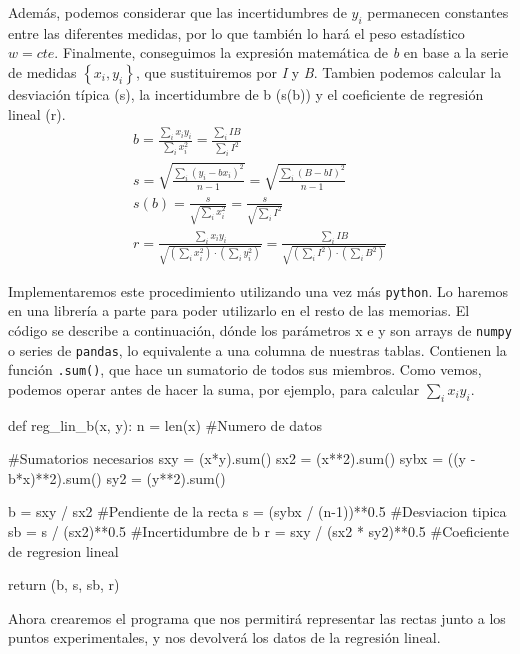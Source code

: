 \documentclass[12pt, a4paper, titlepage]{article}
\newcommand{\code}[1]{\texttt{#1}} %
\begin{document}
  Además, podemos considerar que las incertidumbres de $y_i$ permanecen constantes entre las diferentes medidas, por lo que también lo hará el peso estadístico $w = cte$. Finalmente, conseguimos la expresión matemática de \textit{b} en base a la serie de medidas $\left\{ x_i, y_i \right\}$, que sustituiremos por \textit{I} y \textit{B}. Tambien podemos calcular la desviación típica (s), la incertidumbre de b (s(b)) y el coeficiente de regresión lineal (r).
  \begin{gather}
    b = \frac{\sum_i{x_i y_i}}{\sum_i{x_i^2}} = \frac{\sum_i{I B}}{\sum_i{I^2}} \label{ec:regb} \\
    s = \sqrt{\frac{\sum_i{(y_i - bx_i)^2}}{n - 1}} = \sqrt{\frac{\sum_i{(B - bI)^2}}{n - 1}} \label{ec:regs} \\
    s(b) = \frac{s}{\sqrt{\sum_i{x_i^2}}} = \frac{s}{\sqrt{\sum_i{I^2}}} \label{ec:regsb} \\
    r = \frac{\sum_i{x_i y_i}}{\sqrt{(\sum_i{x_i^2}) \cdot (\sum_i{y_i^2})}} = \frac{\sum_i{I B}}{\sqrt{(\sum_i{I^2}) \cdot (\sum_i{B^2})}} \label{ec:regr}
  \end{gather}

  Implementaremos este procedimiento utilizando una vez más \code{python}. Lo haremos en una librería a parte para poder utilizarlo en el resto de las memorias. El código se describe a continuación, dónde los parámetros x e y son arrays de \code{numpy} o series de \code{pandas}, lo equivalente a una columna de nuestras tablas. Contienen la función \code{.sum()}, que hace un sumatorio de todos sus miembros. Como vemos, podemos operar antes de hacer la suma, por ejemplo, para calcular $\sum_i{x_i y_i}$.

  \begin{python}
    def reg_lin_b(x, y):
        n = len(x) #Numero de datos

        #Sumatorios necesarios
        sxy = (x*y).sum()
        sx2 = (x**2).sum()
        sybx = ((y - b*x)**2).sum()
        sy2 = (y**2).sum()

        b = sxy / sx2 #Pendiente de la recta
        s = (sybx / (n-1))**0.5 #Desviacion tipica
        sb = s / (sx2)**0.5 #Incertidumbre de b
        r = sxy / (sx2 * sy2)**0.5 #Coeficiente de regresion lineal

        return (b, s, sb, r)
  \end{python}

  Ahora crearemos el programa que nos permitirá representar las rectas junto a los puntos experimentales, y nos devolverá los datos de la regresión lineal.
\end{document}

